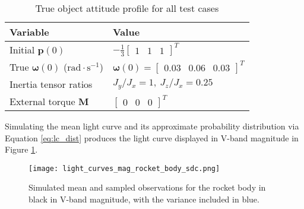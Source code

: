\documentclass[a4paper,twocolumn]{spaceDebrisC} %
\newcommand{\vctr}[1]{\bm{#1}}
\newcommand{\figmed}[0]{0.4\textwidth}
\newcommand{\figsmall}[0]{0.3\textwidth}
\begin{document}
\begin{table}[H]
  \centering
  \caption{True object attitude profile for all test cases}
  \vspace*{6pt}
  \begin{tabular}{|l|l|}
  \hline
  \textbf{Variable} & \textbf{Value} \\ \hline
 Initial $\vctr{p}(0)$ & $-\frac{1}{3} \begin{bmatrix} 1 & 1 & 1 \end{bmatrix}^T$ \\ \hline
 True $\vctr{\omega}(0)$ ($\text{rad}\cdot\text{s}^{-1}$) & $\vctr{\omega}(0) = \begin{bmatrix} 0.03 & 0.06 & 0.03 \end{bmatrix}^T$ \\ \hline
 Inertia tensor ratios & $J_y / J_x = 1, \: J_z / J_x = 0.25$ \\ \hline
 External torque $\vctr{M}$ & $\begin{bmatrix} 0 & 0 & 0 \end{bmatrix}^T$ \\ \hline
  \end{tabular}
  \label{tb:synth_att}
\end{table}
\FloatBarrier

Simulating the mean light curve and its approximate probability distribution via Equation \ref{eq:lc_dist} produces the light curve displayed in V-band magnitude in Figure \ref{fig:obs_mag_synth}.


\begin{figure}[H]
  \centering
  \texttt{[image: light\_curves\_mag\_rocket\_body\_sdc.png]}
  \caption{Simulated mean and sampled observations for the rocket body in black in V-band magnitude, with the variance included in blue.}
  \label{fig:obs_mag_synth}
\end{figure}

\end{document}
